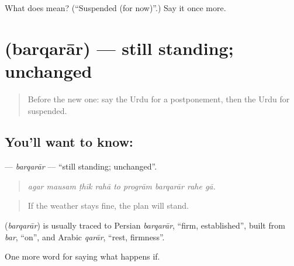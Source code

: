 \begin{tcolorbox}[breakable,colback=teal!4,colframe=teal!35!black,title={Before you move on}]
What does  mean? (\textquotedblleft{}Suspended (for now)\textquotedblright{}.) Say it once more.
\end{tcolorbox}
\section[\texorpdfstring{\ur{برقرار} (barqarār)}{برقرار (barqarār)}]{ (barqarār) — still standing; unchanged}

\label{lesson:UR-C525-barqarar}



\begin{quote}
Before the new one: say the Urdu for a postponement, then the Urdu for suspended.
\end{quote}

\subsection*{You'll want to know: }
\textbf{} — \emph{barqarār} — \textquotedblleft{}still standing; unchanged\textquotedblright{}.

\begin{quote}
        
\end{quote}

\begin{quote}
\emph{agar mausam ṭhīk rahā to progrām barqarār rahe gā.}
\end{quote}

\begin{quote}
If the weather stays fine, the plan will stand.
\end{quote}

\begin{cousinweb}
\textbf{} (\emph{barqarār}) is usually traced to Persian \emph{barqarār}, \textquotedblleft{}firm, established\textquotedblright{}, built from \emph{bar}, \textquotedblleft{}on\textquotedblright{}, and Arabic \emph{qarār}, \textquotedblleft{}rest, firmness\textquotedblright{}.
\end{cousinweb}

\begin{grammarlens}[title={What you've built}]
One more word for saying what happens if.
\end{grammarlens}


